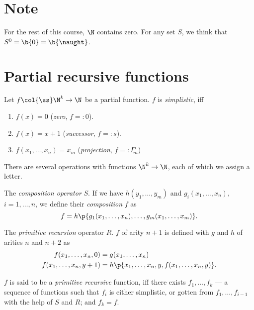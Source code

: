 
\section{Note}

For the rest of this course, $\N$ contains zero.
For any set $S$, we think that $S^0 = \b{0} = \b{\naught}$.

\section{Partial recursive functions}

\begin{definition}
  \label{simplistic}
  Let $f \col {\ss} \N^k \to \N$ be a partial function.
  $f$ is \emph{simplistic}, iff
  \begin{enumerate}
    \item $f(x) = 0$ (\emph{zero}, $f =: 0$).
    \item $f(x) = x+1$ (\emph{successor}, $f =: s$).
    \item $f(x_1, \dots, x_n) = x_m$ (\emph{projection}, $f =: I^n_m$)
  \end{enumerate}
\end{definition}
  
\begin{definition}
  There are several operations with functions $\N^k \to \N$, each of which we assign a letter. 
  
  The \emph{composition operator} $S$. If we have $h(y_1, \dots, y_m)$ and $g_i(x_1, \dots, x_n)$, $i=1, \dots, n$, we define their \emph{composition}
  $f$ as
  $$ f = h\p{g_1(x_1, \dots, x_n), \dots, g_m(x_1, \dots, x_m)}. $$
  
  The \emph{primitive recursion} operator $R$.
  $f$ of arity $n+1$ is defined with $g$ and $h$ of arities $n$ and $n+2$ as
  \begin{align*}
    f(x_1, \dots, x_n, 0) &= g(x_1, \dots, x_n) \\
    f(x_1, \dots, x_n, y+1) &= h\p{x_1, \dots, x_n, y, f(x_1, \dots, x_n, y)}.
  \end{align*}
  
  $f$ is said to be a \emph{primitive recursive} function, iff there exists $f_1, \dots, f_k$ --- a sequence of functions such that $f_i$ is either simplistic, or gotten from $f_1, \dots, f_{i-1}$ with the help of $S$ and $R$; and $f_k = f$.
\end{definition}

